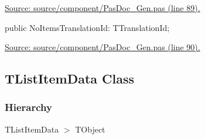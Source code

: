 \documentclass{report}
\newif\ifpdf
\begin{document}
\begin{list}{}
\par  \par
\href{https://github.com/pasdoc/pasdoc/blob/master/source/component/PasDoc_Gen.pas#L89}{Source: source/component/PasDoc{\_}Gen.pas (line 89).}\label{PasDoc_Gen.TOverviewFileInfo-NoItemsTranslationId}
\item[\textbf{NoItemsTranslationId}\hfill]
\ifpdf
\begin{flushleft}
\fi
\begin{ttfamily}
public NoItemsTranslationId: TTranslationId;\end{ttfamily}

\ifpdf
\end{flushleft}
\fi


\par  \par
\href{https://github.com/pasdoc/pasdoc/blob/master/source/component/PasDoc_Gen.pas#L90}{Source: source/component/PasDoc{\_}Gen.pas (line 90).}\end{list}
\ifpdf
\subsection*{\large{\textbf{TListItemData Class}}\normalsize\hspace{1ex}\hrulefill}
\else
\subsection*{TListItemData Class}
\fi
\label{PasDoc_Gen.TListItemData}
\subsubsection*{\large{\textbf{Hierarchy}}\normalsize\hspace{1ex}\hfill}
TListItemData {$>$} TObject
\end{document}
